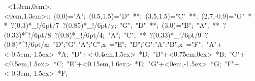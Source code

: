 %


\hbox{
\xy    <1.3cm,0cm>:<0cm,1.3cm>::
       (0,0)="A";  (0.5,1.5)="D" **\dir{-}; (3.5,1.5)="C" **\dir{-};  
	 (2.7,-0.9)="G" **\dir{-} ?(0.3)*_!/6pt/{7} ?(0.85)*_!/6pt/{y}; 
	 "G"; "D" **\dir{-}; (3,0)="B"; "A"; **\dir{-} ?(0.33)*^!/6pt/{8} ?(0.8)*_!/6pt/{4}; 
       "A"; "C"; **\dir{-} ?(0.33)*_!/6pt/{9} ?(0.8)*^!/6pt/{x};   
	 {"D";"G":"A";"C",x} ="E";
	 {"D";"G":"A";"B",x} ="F";
       "A"+<-0.5em,-1.5ex> *{A};
       "D"+<-0.4em,1.5ex> *{D};
       "B"+<0.75em,0ex> *{B};
       "C"+<0.5em,1.5ex> *{C};
       "E"+<0.15em,1.6ex> *{E};
       "G"+<0em,-1.5ex> *{G};       "F"+<-0.3em,-1.5ex> *{F};
       \endxy}
	   
